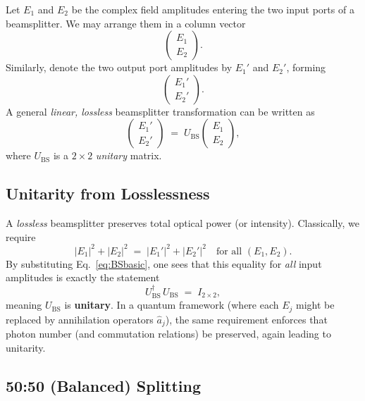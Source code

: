 \documentclass[12pt]{article}
\begin{document}
Let $E_1$ and $E_2$ be the complex field amplitudes entering the two input ports of a beamsplitter.  We may arrange them in a column vector
\begin{equation}
  \begin{pmatrix}
    E_1 \\[4pt]
    E_2
  \end{pmatrix}.
\end{equation}
Similarly, denote the two output port amplitudes by $E_1'$ and $E_2'$, forming
\begin{equation}
  \begin{pmatrix}
    E_1' \\[4pt]
    E_2'
  \end{pmatrix}.
\end{equation}
A general \emph{linear, lossless} beamsplitter transformation can be written as
\begin{equation}
\label{eq:BSbasic}
  \begin{pmatrix}
    E_1' \\[3pt]
    E_2'
  \end{pmatrix}
  \;=\;
  U_{\text{BS}}
  \begin{pmatrix}
    E_1 \\[3pt]
    E_2
  \end{pmatrix},
\end{equation}
where $U_{\text{BS}}$ is a $2\times 2$ \emph{unitary} matrix.

\subsection{Unitarity from Losslessness}

A \emph{lossless} beamsplitter preserves total optical power (or intensity).  Classically, we require
\begin{equation}
  |E_1|^2 + |E_2|^2
  \;=\;
  |E_1'|^2 + |E_2'|^2
  \quad
  \text{for all } (E_1, E_2).
\end{equation}
By substituting Eq.~\eqref{eq:BSbasic}, one sees that this equality for \emph{all} input amplitudes is exactly the statement
\[
  U_{\text{BS}}^\dagger \, U_{\text{BS}} \;=\; I_{2\times 2},
\]
meaning $U_{\text{BS}}$ is \textbf{unitary}.  
In a quantum framework (where each $E_j$ might be replaced by annihilation operators $\hat{a}_j$), the same requirement enforces that photon number (and commutation relations) be preserved, again leading to unitarity.

\subsection{50:50 (Balanced) Splitting}
\end{document}

